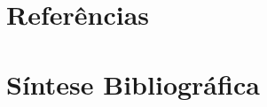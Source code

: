 \documentclass[
    12pt,               %
    a4paper,            %
    english,            %
    brazil,             %
    ]{article}
\begin{document}

\section{Referências}

    \vspace{-4.3em}
    \renewcommand\refname{}

    

\section{Síntese Bibliográfica}


\end{document}
